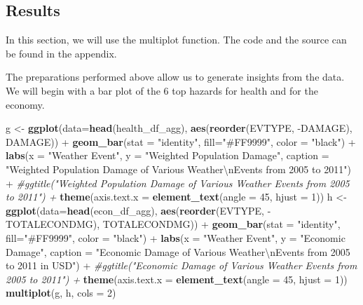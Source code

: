 \documentclass[]{article}
\newenvironment{Shaded}{\begin{snugshade}}{\end{snugshade}}
\newcommand{\KeywordTok}[1]{\textcolor[rgb]{0.13,0.29,0.53}{\textbf{{#1}}}}
\newcommand{\DataTypeTok}[1]{\textcolor[rgb]{0.13,0.29,0.53}{{#1}}}
\newcommand{\DecValTok}[1]{\textcolor[rgb]{0.00,0.00,0.81}{{#1}}}
\newcommand{\CharTok}[1]{\textcolor[rgb]{0.31,0.60,0.02}{{#1}}}
\newcommand{\StringTok}[1]{\textcolor[rgb]{0.31,0.60,0.02}{{#1}}}
\newcommand{\CommentTok}[1]{\textcolor[rgb]{0.56,0.35,0.01}{\textit{{#1}}}}
\newcommand{\NormalTok}[1]{{#1}}
\begin{document}
\subsection{Results}\label{results}

In this section, we will use the multiplot function. The code and the
source can be found in the appendix.

The preparations performed above allow us to generate insights from the
data. We will begin with a bar plot of the 6 top hazards for health and
for the economy.

\begin{Shaded}
\begin{Highlighting}[]
\NormalTok{g <-}\StringTok{ }\KeywordTok{ggplot}\NormalTok{(}\DataTypeTok{data=}\KeywordTok{head}\NormalTok{(health_df_agg), }\KeywordTok{aes}\NormalTok{(}\KeywordTok{reorder}\NormalTok{(EVTYPE, -DAMAGE), DAMAGE)) +}
\StringTok{  }\KeywordTok{geom_bar}\NormalTok{(}\DataTypeTok{stat =} \StringTok{"identity"}\NormalTok{, }\DataTypeTok{fill=}\StringTok{"#FF9999"}\NormalTok{, }\DataTypeTok{color =} \StringTok{"black"}\NormalTok{) +}\StringTok{ }
\StringTok{  }\KeywordTok{labs}\NormalTok{(}\DataTypeTok{x =} \StringTok{"Weather Event"}\NormalTok{, }\DataTypeTok{y =} \StringTok{"Weighted Population Damage"}\NormalTok{,}
       \DataTypeTok{caption =} \StringTok{"Weighted Population Damage of Various Weather}\CharTok{\textbackslash{}n}\StringTok{Events from 2005 to 2011"}\NormalTok{) +}\StringTok{ }
\StringTok{  }\CommentTok{#ggtitle("Weighted Population Damage of Various Weather Events from 2005 to 2011") + }
\StringTok{  }\KeywordTok{theme}\NormalTok{(}\DataTypeTok{axis.text.x =} \KeywordTok{element_text}\NormalTok{(}\DataTypeTok{angle =} \DecValTok{45}\NormalTok{, }\DataTypeTok{hjust =} \DecValTok{1}\NormalTok{))}
\NormalTok{h <-}\StringTok{ }\KeywordTok{ggplot}\NormalTok{(}\DataTypeTok{data=}\KeywordTok{head}\NormalTok{(econ_df_agg), }\KeywordTok{aes}\NormalTok{(}\KeywordTok{reorder}\NormalTok{(EVTYPE, -TOTALECONDMG), TOTALECONDMG)) +}
\StringTok{  }\KeywordTok{geom_bar}\NormalTok{(}\DataTypeTok{stat =} \StringTok{"identity"}\NormalTok{, }\DataTypeTok{fill=}\StringTok{"#FF9999"}\NormalTok{, }\DataTypeTok{color =} \StringTok{"black"}\NormalTok{) +}\StringTok{ }
\StringTok{  }\KeywordTok{labs}\NormalTok{(}\DataTypeTok{x =} \StringTok{"Weather Event"}\NormalTok{, }\DataTypeTok{y =} \StringTok{"Economic Damage"}\NormalTok{,}
       \DataTypeTok{caption =} \StringTok{"Economic Damage of Various Weather}\CharTok{\textbackslash{}n}\StringTok{Events from 2005 to 2011 in USD"}\NormalTok{) +}\StringTok{ }
\StringTok{  }\CommentTok{#ggtitle("Economic Damage of Various Weather Events from 2005 to 2011") + }
\StringTok{  }\KeywordTok{theme}\NormalTok{(}\DataTypeTok{axis.text.x =} \KeywordTok{element_text}\NormalTok{(}\DataTypeTok{angle =} \DecValTok{45}\NormalTok{, }\DataTypeTok{hjust =} \DecValTok{1}\NormalTok{))}
\KeywordTok{multiplot}\NormalTok{(g, h, }\DataTypeTok{cols =} \DecValTok{2}\NormalTok{)}
\end{Highlighting}
\end{Shaded}
\end{document}
